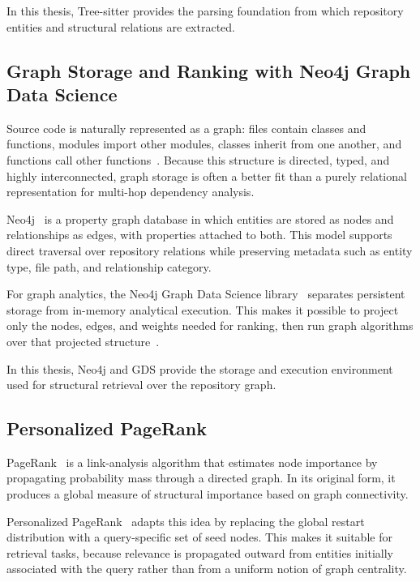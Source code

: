 In this thesis, Tree-sitter provides the parsing foundation from which repository entities and structural relations are extracted.

\subsection{Graph Storage and Ranking with Neo4j Graph Data Science}
\label{sec:neo4j-gds-bg}

Source code is naturally represented as a graph: files contain classes and functions, modules import other modules, classes inherit from one another, and functions call other functions~\cite{robinson2013graph}. Because this structure is directed, typed, and highly interconnected, graph storage is often a better fit than a purely relational representation for multi-hop dependency analysis.

Neo4j~\cite{neo4j2024docs} is a property graph database in which entities are stored as nodes and relationships as edges, with properties attached to both. This model supports direct traversal over repository relations while preserving metadata such as entity type, file path, and relationship category.

For graph analytics, the Neo4j Graph Data Science library~\cite{neo4jgds2024catalog} separates persistent storage from in-memory analytical execution. This makes it possible to project only the nodes, edges, and weights needed for ranking, then run graph algorithms over that projected structure~\cite{neo4jgds2024pagerank}.

In this thesis, Neo4j and GDS provide the storage and execution environment used for structural retrieval over the repository graph.

\subsection{Personalized PageRank}
\label{sec:ppr-bg}

PageRank~\cite{brin1998pagerank} is a link-analysis algorithm that estimates node importance by propagating probability mass through a directed graph. In its original form, it produces a global measure of structural importance based on graph connectivity.

Personalized PageRank~\cite{jeh2003ppr} adapts this idea by replacing the global restart distribution with a query-specific set of seed nodes. This makes it suitable for retrieval tasks, because relevance is propagated outward from entities initially associated with the query rather than from a uniform notion of graph centrality.

